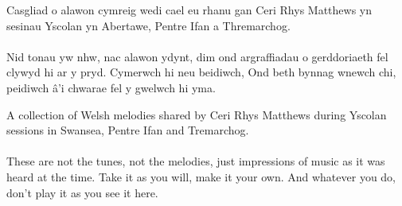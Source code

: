 \begin{multicols}{2}
  \normalsize{
    \noindent Casgliad o alawon cymreig wedi cael eu rhanu gan Ceri Rhys Matthews
    yn sesinau Yscolan yn Abertawe, Pentre Ifan a Thremarchog.
    \\
    \\
    Nid tonau yw nhw, nac alawon ydynt, dim ond argraffiadau o gerddoriaeth
    fel clywyd hi ar y pryd. Cymerwch hi neu beidiwch, Ond beth bynnag wnewch chi,
    peidiwch â'i chwarae fel y gwelwch hi yma.
  }

  \newcolumn

  \normalsize{
    \noindent A collection of Welsh melodies shared by Ceri Rhys Matthews
    during Yscolan sessions in Swansea, Pentre Ifan and Tremarchog.
    \\
    \\
    These are not the tunes, not the melodies, just impressions of music
    as it was heard at the time. Take it as you will, make it your own.
    And whatever you do, don't play it as you see it here.
  }

\end{multicols}